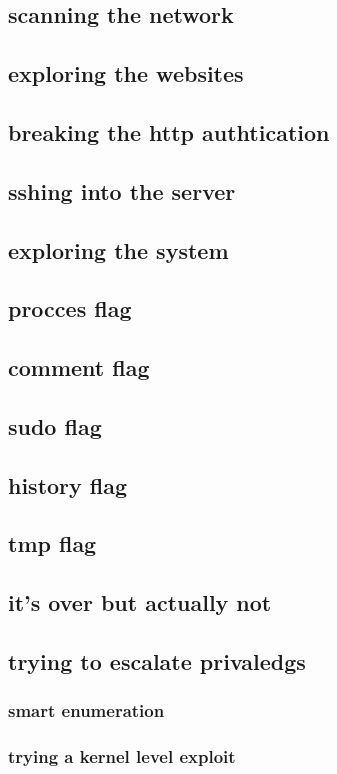 \documentclass[a4paper]{article}
\begin{document}
\subsection{scanning the network}
\subsection{exploring the websites}
\subsection{breaking the http authtication}
\subsection{sshing into the server}
\subsection{exploring the system}
\subsection{procces flag}
\subsection{comment flag}
\subsection{sudo flag}
\subsection{history flag}
\subsection{tmp flag}
\subsection{it's over but actually not}
\subsection{trying to escalate privaledgs}
\subsubsection{smart enumeration}
\subsubsection{trying a kernel level exploit}
\end{document}
